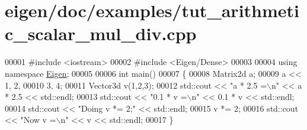 \hypertarget{eigen_2doc_2examples_2tut__arithmetic__scalar__mul__div_8cpp_source}{}\section{eigen/doc/examples/tut\+\_\+arithmetic\+\_\+scalar\+\_\+mul\+\_\+div.cpp}
\label{eigen_2doc_2examples_2tut__arithmetic__scalar__mul__div_8cpp_source}

\begin{DoxyCode}
00001 \textcolor{preprocessor}{#include <iostream>}
00002 \textcolor{preprocessor}{#include <Eigen/Dense>}
00003 
00004 \textcolor{keyword}{using namespace }\hyperlink{namespace_eigen}{Eigen};
00005 
00006 \textcolor{keywordtype}{int} main()
00007 \{
00008   Matrix2d a;
00009   a << 1, 2,
00010        3, 4;
00011   Vector3d v(1,2,3);
00012   std::cout << \textcolor{stringliteral}{"a * 2.5 =\(\backslash\)n"} << a * 2.5 << std::endl;
00013   std::cout << \textcolor{stringliteral}{"0.1 * v =\(\backslash\)n"} << 0.1 * v << std::endl;
00014   std::cout << \textcolor{stringliteral}{"Doing v *= 2;"} << std::endl;
00015   v *= 2;
00016   std::cout << \textcolor{stringliteral}{"Now v =\(\backslash\)n"} << v << std::endl;
00017 \}
\end{DoxyCode}
